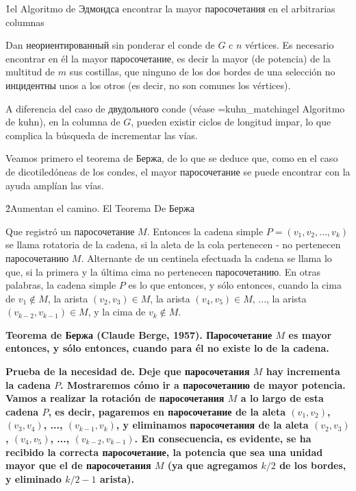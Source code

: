 \h1{el Algoritmo de Эдмондса encontrar la mayor паросочетания en el arbitrarias columnas}

Dan неориентированный sin ponderar el conde de $G$ c $n$ vértices. Es necesario encontrar en él la mayor паросочетание, es decir la mayor (de potencia) de la multitud de $m$ sus costillas, que ninguno de los dos bordes de una selección no инцидентны unos a los otros (es decir, no son comunes los vértices).

A diferencia del caso de двудольного conde (véase \algohref=kuhn_matching{el Algoritmo de kuhn}), en la columna de $G$, pueden existir ciclos de longitud impar, lo que complica la búsqueda de incrementar las vías.

Veamos primero el teorema de Бержа, de lo que se deduce que, como en el caso de dicotiledóneas de los condes, el mayor паросочетание se puede encontrar con la ayuda amplían las vías.


\h2{Aumentan el camino. El Teorema De Бержа}

Que registró un паросочетание $M$. Entonces la cadena simple $P = (v_1, v_2, \ldots, v_k)$ se llama rotatoria de la cadena, si la aleta de la cola pertenecen - no pertenecen паросочетанию $M$. Alternante de un centinela efectuada la cadena se llama lo que, si la primera y la última cima no pertenecen паросочетанию. En otras palabras, la cadena simple $P$ es lo que entonces, y sólo entonces, cuando la cima de $v_1 \not\in M$, la arista $(v_2,v_3) \in M$, la arista $(v_4,v_5) \in M$, ..., la arista $(v_{k-2},v_{k-1}) \in M$, y la cima de $v_k \not\in M$.


\bf{Teorema de Бержа} (Claude Berge, 1957). Паросочетание $M$ es mayor entonces, y sólo entonces, cuando para él no existe lo de la cadena.

\bf{Prueba de la necesidad de}. Deje que паросочетания $M$ hay incrementa la cadena $P$. Mostraremos cómo ir a паросочетанию de mayor potencia. Vamos a realizar la rotación de паросочетания $M$ a lo largo de esta cadena $P$, es decir, pagaremos en паросочетание de la aleta $(v_1,v_2)$, $(v_3,v_4)$, ..., $(v_{k-1},v_k)$, y eliminamos паросочетания de la aleta $(v_2,v_3)$, $(v_4,v_5)$, ..., $(v_{k-2},v_{k-1})$. En consecuencia, es evidente, se ha recibido la correcta паросочетание, la potencia que sea una unidad mayor que el de паросочетания $M$ (ya que agregamos $k/2$ de los bordes, y eliminado $k/2-1$ arista).

